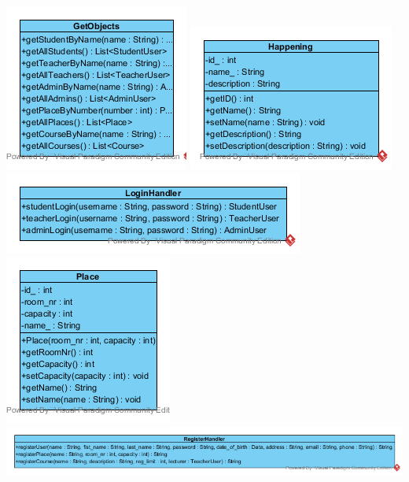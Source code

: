 \documentclass[a4paper,12pt]{article}
\begin{document}
\begin{center}
	\includegraphics[scale=1]{cGetObjects.png}
	\includegraphics[scale=1]{cHappening.png}
	\includegraphics[scale=1]{cLoginHandler.png}
	\includegraphics[scale=1]{cPlace.png}
	\includegraphics[scale=.8]{cRegisterHandler.png}

\end{center}
\end{document}
